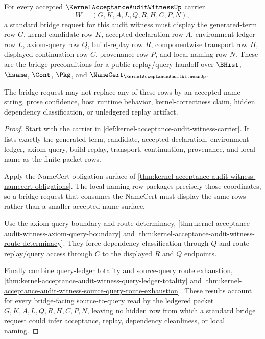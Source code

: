 \begin{theorem}
\label{thm:kernel-acceptance-audit-witness-standard-bridge-preconditions}
For every accepted $\KernelAcceptanceAuditWitnessUp$ carrier
$$
W=(G,K,A,L,Q,R,H,C,P,N),
$$
a standard bridge request for this audit witness must display the generated-term row $G$, kernel-candidate row $K$, accepted-declaration row $A$, environment-ledger row $L$, axiom-query row $Q$, build-replay row $R$, componentwise transport row $H$, displayed continuation row $C$, provenance row $P$, and local naming row $N$. These are the bridge preconditions for a public replay/query handoff over $\BHist$, $\hsame$, $\Cont$, $\Pkg$, and $\NameCert_{\KernelAcceptanceAuditWitnessUp}$.

The bridge request may not replace any of these rows by an accepted-name string, prose confidence, host runtime behavior, kernel-correctness claim, hidden dependency classification, or unledgered replay artifact.
\end{theorem}
\begin{proof}
Start with the carrier in \autoref{def:kernel-acceptance-audit-witness-carrier}. It lists exactly the generated term, candidate, accepted declaration, environment ledger, axiom query, build replay, transport, continuation, provenance, and local name as the finite packet rows.

Apply the NameCert obligation surface of \autoref{thm:kernel-acceptance-audit-witness-namecert-obligations}. The local naming row packages precisely those coordinates, so a bridge request that consumes the NameCert must display the same rows rather than a smaller accepted-name surface.

Use the axiom-query boundary and route determinacy, \autoref{thm:kernel-acceptance-audit-witness-axiom-query-boundary} and \autoref{thm:kernel-acceptance-audit-witness-route-determinacy}. They force dependency classification through $Q$ and route replay/query access through $C$ to the displayed $R$ and $Q$ endpoints.

Finally combine query-ledger totality and source-query route exhaustion, \autoref{thm:kernel-acceptance-audit-witness-query-ledger-totality} and \autoref{thm:kernel-acceptance-audit-witness-source-query-route-exhaustion}. These results account for every bridge-facing source-to-query read by the ledgered packet $G,K,A,L,Q,R,H,C,P,N$, leaving no hidden row from which a standard bridge request could infer acceptance, replay, dependency cleanliness, or local naming.
\end{proof}

